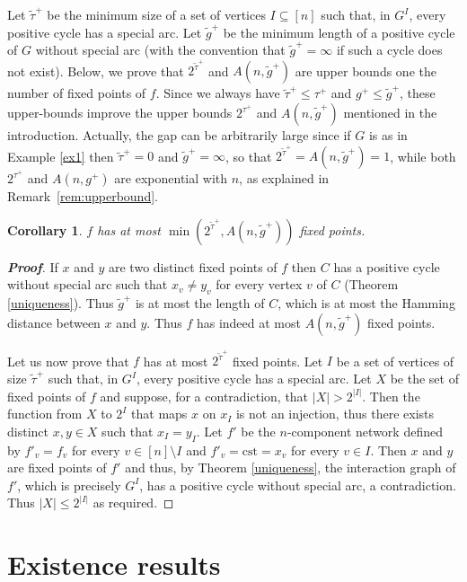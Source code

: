 \documentclass[11pt,a4paper]{article}
\newtheorem{corollary}{Corollary}
\def\cst{\mathrm{cst}}
\begin{document}
Let $\tilde\tau^+$ be the minimum size of a set of vertices $I\subseteq [n]$ such that, in $G^I$, every positive cycle has a special arc. Let $\tilde g^+$ be the minimum length of a positive cycle of $G$ without special arc (with the convention that $\tilde g^+=\infty$ if such a cycle does not exist). Below, we prove that $2^{\tilde\tau^+}$ and $A(n,\tilde g^+)$ are upper bounds one the number of fixed points of $f$. Since we always have $\tilde\tau^+\leq \tau^+$ and $g^+\leq \tilde g^+$, these upper-bounds improve the upper bounds $2^{\tau^+}$ and $A(n,\tilde g^+)$ mentioned in the introduction. Actually, the gap can be arbitrarily large since if $G$ is as in Example \ref{ex1} then $\tilde\tau^+=0$ and $\tilde g^+=\infty$, so that $2^{\tilde \tau^+}=A(n,\tilde g^+)=1$, while both $2^{\tau^+}$ and $A(n,g^+)$ are exponential with $n$, as explained in Remark~\ref{rem:upperbound}. 

\begin{corollary}\label{newupperbound}
$f$ has at most $\min(2^{\tilde \tau^+},A(n,\tilde g^+))$ fixed points. 
\end{corollary} 


\begin{proof}[{\bf Proof}]
If $x$ and $y$ are two distinct fixed points of $f$ then $C$ has a positive cycle without special arc such that $x_v\neq y_v$ for every vertex $v$ of $C$ (Theorem \ref{uniqueness}). Thus $\tilde g^+$ is at most the length of $C$, which is at most the Hamming distance between $x$ and $y$. Thus $f$ has indeed at most $A(n,\tilde g^+)$ fixed points. 

\medskip
Let us now prove that $f$ has at most $2^{\tilde\tau^+}$ fixed points. Let $I$ be a set of vertices of size $\tilde\tau^+$ such that, in $G^I$, every positive cycle has a special arc. Let $X$ be the set of fixed points of $f$ and suppose, for a contradiction, that $|X|>2^{|I|}$. Then the function from $X$ to $2^I$ that maps $x$ on $x_I$ is not an injection, thus there exists distinct $x,y\in X$ such that $x_I=y_I$. Let $f'$ be the $n$-component network defined by $f'_v=f_v$ for every $v\in [n]\setminus  I$ and $f'_v=\cst=x_v$ for every $v\in I$. Then $x$ and $y$ are fixed points of $f'$ and thus, by Theorem  \ref{uniqueness}, the interaction graph of $f'$, which is precisely $G^I$, has a positive cycle without special arc, a contradiction. Thus $|X|\leq 2^{|I|}$ as required. 
\end{proof}


\section{Existence results}\label{sec:existence}
\end{document}
